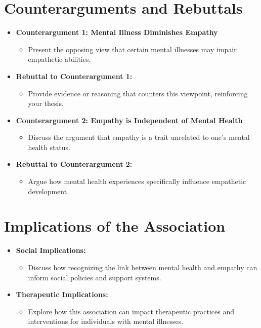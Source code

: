 \documentclass[stu]{apa7}
\begin{document}
\section{Counterarguments and Rebuttals}
\begin{itemize}
    \item \textbf{Counterargument 1: Mental Illness Diminishes Empathy}
        \begin{itemize}
            \item Present the opposing view that certain mental illnesses may impair empathetic abilities.
        \end{itemize}
    \item \textbf{Rebuttal to Counterargument 1:}
        \begin{itemize}
            \item Provide evidence or reasoning that counters this viewpoint, reinforcing your thesis.
        \end{itemize}
    \item \textbf{Counterargument 2: Empathy is Independent of Mental Health}
        \begin{itemize}
            \item Discuss the argument that empathy is a trait unrelated to one's mental health status.
        \end{itemize}
    \item \textbf{Rebuttal to Counterargument 2:}
        \begin{itemize}
            \item Argue how mental health experiences specifically influence empathetic development.
        \end{itemize}
\end{itemize}

\section{Implications of the Association}
\begin{itemize}
    \item \textbf{Social Implications:}
        \begin{itemize}
            \item Discuss how recognizing the link between mental health and empathy can inform social policies and support systems.
        \end{itemize}
    \item \textbf{Therapeutic Implications:}
        \begin{itemize}
            \item Explore how this association can impact therapeutic practices and interventions for individuals with mental illnesses.
        \end{itemize}
\end{itemize}
\end{document}
